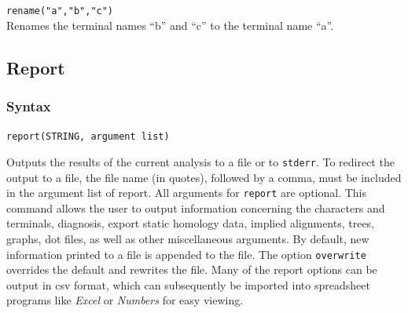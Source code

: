 	\begin{example}
		\item{\texttt{rename("a","b","c")}\\ Renames the terminal names ``b'' and ``c'' to 
		the terminal name ``a''. }
	\end{example}


\subsection{Report}
	\subsubsection{Syntax}
		\texttt{report(STRING, argument list)}
	
	\begin{phygdescription}
		{Outputs the results of the current analysis to a file or to \texttt{stderr}. To redirect the 
		output to a file, the file name (in quotes), followed by a comma, must be included in 
		the argument list of report. All arguments for \texttt{report} are optional. This command 
		allows the user to output information concerning the characters and terminals, 
		diagnosis, export static homology data, implied alignments, trees, graphs, dot files, 
		as well as other miscellaneous arguments. By default, new information printed to 
		a file is appended to the file. The option \texttt{overwrite} overrides the default and 
		rewrites the file. Many of the report options can be output in csv format,  which can
		subsequently be imported into spreadsheet programs like \textit{Excel} or 
		\textit{Numbers} for easy viewing.}
	\end{phygdescription}
	
